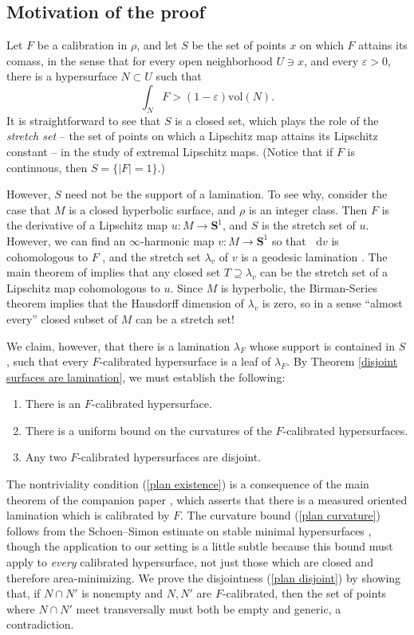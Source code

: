\documentclass[reqno,11pt]{amsart}
\newcommand{\Sph}{\mathbf S}
\newcommand*\dif{\mathop{}\!\mathrm{d}}
\newcommand{\vol}{\mathrm{vol}}
\newcommand{\dfn}[1]{\emph{#1}\index{#1}}
\theoremstyle{definition}
\numberwithin{equation}{section}
\begin{document}
\subsection{Motivation of the proof}
Let $F$ be a calibration in $\rho$, and let $S$ be the set of points $x$ on which $F$ attains its comass, in the sense that for every open neighborhood $U \ni x$, and every $\varepsilon > 0$, there is a hypersurface $N \subset U$ such that 
$$\int_N F > (1 - \varepsilon) \vol(N).$$
It is straightforward to see that $S$ is a closed set, which plays the role of the \dfn{stretch set} -- the set of points on which a Lipschitz map attains its Lipschitz constant -- in the study of extremal Lipschitz maps. 
(Notice that if $F$ is continuous, then $S = \{|F| = 1\}$.)

However, $S$ need not be the support of a lamination.
To see why, consider the case that $M$ is a closed hyperbolic surface, and $\rho$ is an integer class.
Then $F$ is the derivative of a Lipschitz map $u: M \to \Sph^1$, and $S$ is the stretch set of $u$.
However, we can find an $\infty$-harmonic map $v: M \to \Sph^1$ so that $\dif v$ is cohomologous to $F$ \cite[Theorem 2.4]{daskalopoulos2020transverse}, and the stretch set $\lambda_v$ of $v$ is a geodesic lamination \cite[Theorem 5.2]{daskalopoulos2020transverse}.
The main theorem of \cite{BackusZeAn} implies that any closed set $T \supseteq \lambda_v$ can be the stretch set of a Lipschitz map cohomologous to $u$.
Since $M$ is hyperbolic, the Birman-Series theorem implies that the Hausdorff dimension of $\lambda_v$ is zero, so in a sense ``almost every'' closed subset of $M$ can be a stretch set!

We claim, however, that there is a lamination $\lambda_F$ whose support is contained in $S$, such that every $F$-calibrated hypersurface is a leaf of $\lambda_F$.
By Theorem \ref{disjoint surfaces are lamination}, we must establish the following:
\begin{enumerate}
\item There is an $F$-calibrated hypersurface. \label{plan existence}
\item There is a uniform bound on the curvatures of the $F$-calibrated hypersurfaces. \label{plan curvature}
\item Any two $F$-calibrated hypersurfaces are disjoint. \label{plan disjoint}
\end{enumerate}
The nontriviality condition (\ref{plan existence}) is a consequence of the main theorem of the companion paper \cite{BackusBest1}, which asserts that there is a measured oriented lamination which is calibrated by $F$.
The curvature bound (\ref{plan curvature}) follows from the Schoen--Simon estimate on stable minimal hypersurfaces \cite{Schoen81}, though the application to our setting is a little subtle because this bound must apply to \emph{every} calibrated hypersurface, not just those which are closed and therefore area-minimizing.
We prove the disjointness (\ref{plan disjoint}) by showing that, if $N \cap N'$ is nonempty and $N, N'$ are $F$-calibrated, then the set of points where $N \cap N'$ meet transversally must both be empty and generic, a contradiction.
\end{document}
